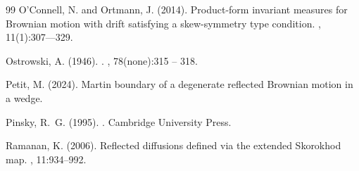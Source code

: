\documentclass[11pt]{article}
\theoremstyle{definition}
\begin{document}
\begin{thebibliography}{99}
O'Connell, N. and Ortmann, J. (2014).
\newblock Product-form invariant measures for Brownian motion with drift satisfying a skew-symmetry type condition.
, 11(1):307–--329.

Ostrowski, A. (1946).
.
, 78(none):315 -- 318.



Petit, M. (2024).
\newblock Martin boundary of a degenerate reflected Brownian motion in a wedge.

Pinsky, R.~G. (1995).
.
\newblock Cambridge University Press.




Ramanan, K. (2006).
\newblock Reflected diffusions defined via the extended Skorokhod map.
, 11:934--992.


\end{thebibliography}
\end{document}
